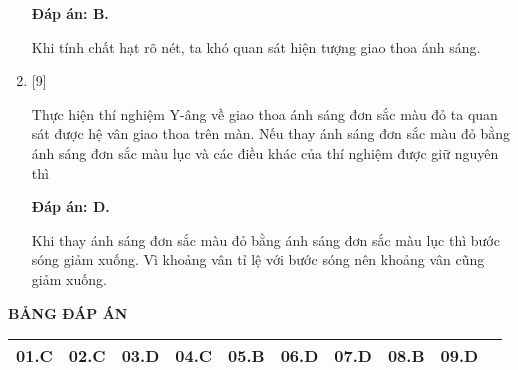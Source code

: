 \begin{enumerate}[label=\bfseries Câu \arabic*:]
	\loigiai
	{		\textbf{Đáp án: B.}
		
Khi tính chất hạt rõ nét, ta khó quan sát hiện tượng giao thoa ánh sáng.
		
	}
    \item {} [9]
    
	\cauhoi
	{Thực hiện thí nghiệm Y-âng về giao thoa ánh sáng đơn sắc màu đỏ ta quan sát được hệ vân giao thoa trên màn. Nếu thay ánh sáng đơn sắc màu đỏ bằng ánh sáng đơn sắc màu lục và các điều khác của thí nghiệm được giữ nguyên thì 
	}
	
	\loigiai
	{		\textbf{Đáp án: D.}
		
Khi thay ánh sáng đơn sắc màu đỏ bằng ánh sáng đơn sắc màu lục thì bước sóng giảm xuống. Vì khoảng vân tỉ lệ với bước sóng nên khoảng vân cũng giảm xuống.
		
	}	

\end{enumerate}

\loigiai
{
	\begin{center}
		\textbf{BẢNG ĐÁP ÁN}
	\end{center}
	\begin{center}
		\begin{tabular}{|m{2.8em}|m{2.8em}|m{2.8em}|m{2.8em}|m{2.8em}|m{2.8em}|m{2.8em}|m{2.8em}|m{2.8em}|m{2.8em}|}
			\hline
			01.C  & 02.C  & 03.D  & 04.C  & 05.B  & 06.D  & 07.D & 08.B & 09.D & \\
			\hline
			
		\end{tabular}
	\end{center}
}


